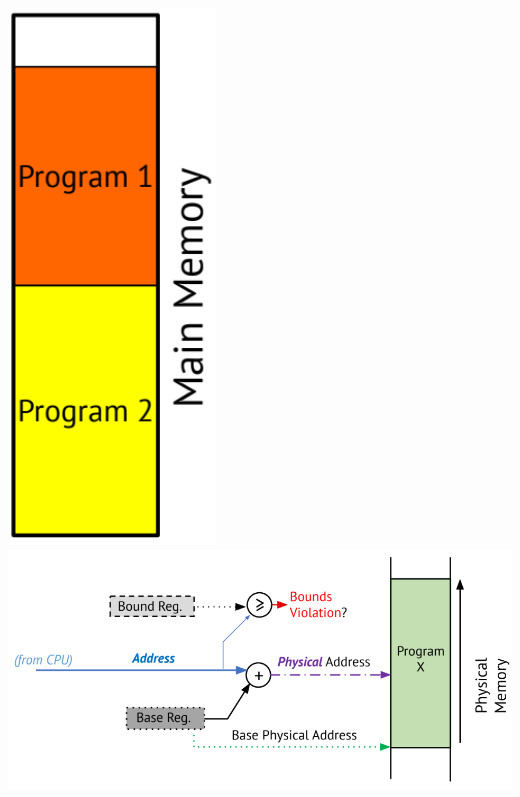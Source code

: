 \documentclass[10pt]{article}
\begin{document}
\begin{center}
    \includegraphics*[scale=0.5]{W7_7.png}
    \includegraphics*[scale=0.6]{W7_8.png}
\end{center}

\hrulefill
\end{document}
